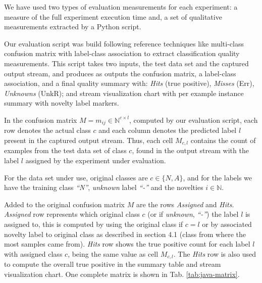 We have used two types of evaluation measurements for each experiment:
a measure of the full experiment execution time
and, a set of qualitative measurements extracted by a Python script.

Our evaluation script was build following reference techniques like
multi-class confusion matrix with label-class association \cite{Faria2016minas}
to extract classification quality measurements.
This script takes two inputs, the test data set and the captured output stream,
and produces as outputs the confusion matrix, a label-class association, and a
final quality summary with:
\emph{Hits} (true positive), \emph{Misses} (Err), \emph{Unknowns} (UnkR); and
stream visualization chart with per example instance summary with novelty label markers.
% 

In the confusion matrix $M = m_{ij} \in \mathbb{N} ^{c \times{} l}$, computed by
our evaluation script, each row denotes %
the actual class $c$ and each column denotes the predicted label $l$ present in
the captured output stream.
Thus, each cell $M_{c, l}$ contains the count of examples from the test data set
of class $c$, found in the output stream with the label $l$ assigned by the
experiment under evaluation.

For the data set under use, original classes are $c \in \{N, A\}$, and for the
labels we have the training class
\emph{``N''}, \emph{unknown} label \emph{``-''} and the novelties $i \in
\mathbb{N}$.

Added to the original confusion matrix $M$ are the rows \emph{Assigned} and
\emph{Hits}.
\emph{Assigned} row represents which original class $c$ (or if \emph{unknown},
\emph{``-''}) the label $l$ is assigned to, this is computed by using the
original class if $c = l$ or by associated novelty label to original class as
described in \cite{DeFaria2015evaluation} section 4.1
(class from where the most samples came from).
\emph{Hits} row shows the true positive count for each label $l$
with assigned class $c$, being the same value as cell $M_{c, l}$.
The \emph{Hits} row is also used to compute the overall true positive
in the summary table and stream visualization chart.
One complete matrix is shown in Tab. \ref{tab:java-matrix}.

